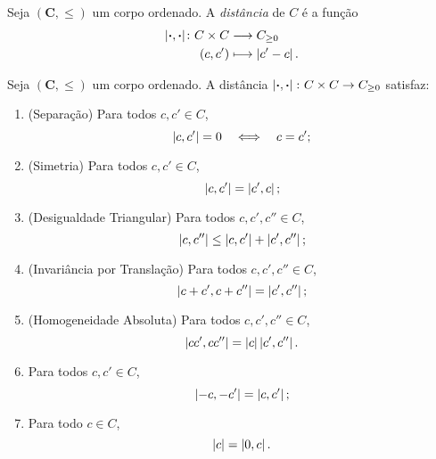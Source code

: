 \begin{definition}
Seja $(\bm C,\leq)$ um corpo ordenado. A \emph{distância} de $C$ é a função
	\begin{align*}
	{\left\vert{\bm{\cdot}},{\bm{\cdot}}\right\vert}\colon {C \times C} &\longrightarrow {C_{\geq 0}} \\{(c,c')} &\longmapsto \left\vert{c'-c}\right\vert.
	\end{align*}
\end{definition}

\begin{proposition}
Seja $(\bm C,\leq)$ um corpo ordenado. A distância $\left\vert{\bm{\cdot}},{\bm{\cdot}}\right\vert\colon C \times C \to C_{\geq 0}$ satisfaz:
	\begin{enumerate}
	\item (Separação) Para todos $c,c' \in C$,
		\begin{equation*}
		\left\vert{c},{c'}\right\vert = 0 \quad \Longleftrightarrow \quad c=c';
		\end{equation*}

	\item (Simetria) Para todos $c,c' \in C$,
		\begin{equation*}
		\left\vert{c},{c'}\right\vert = \left\vert{c'},{c}\right\vert;
		\end{equation*}

	\item (Desigualdade Triangular) Para todos $c,c',c'' \in C$,
		\begin{equation*}
		\left\vert{c},{c''}\right\vert \leq \left\vert{c},{c'}\right\vert + \left\vert{c'},{c''}\right\vert;
		\end{equation*}

	\item (Invariância por Translação) Para todos $c,c',c'' \in C$,
		\begin{equation*}
		\left\vert{c+c'},{c+c''}\right\vert = \left\vert{c'},{c''}\right\vert;
		\end{equation*}

	\item (Homogeneidade Absoluta) Para todos $c,c',c'' \in C$,
		\begin{equation*}
		\left\vert{cc'},{cc''}\right\vert = \left\vert{c}\right\vert\left\vert{c'},{c''}\right\vert.
		\end{equation*}

	\item Para todos $c,c' \in C$,
		\begin{equation*}
		\left\vert{-c},{-c'}\right\vert = \left\vert{c},{c'}\right\vert;
		\end{equation*}

	\item Para todo $c \in C$,
		\begin{equation*}
		\left\vert{c}\right\vert = \left\vert{0},{c}\right\vert.
		\end{equation*}


\end{enumerate}
\end{proposition}
